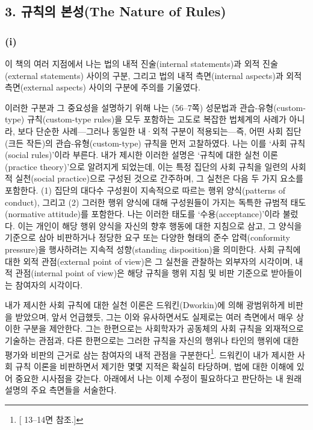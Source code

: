 \subsection{3. 규칙의 본성(The Nature of
Rules)}\label{uxaddcuxce59uxc758-uxbcf8uxc131the-nature-of-rules}

\subsubsection{\texorpdfstring{(i) }{(i) 규칙에 대한 실천 이론(The Practice Theory of Rules)}}\label{i-uxaddcuxce59uxc5d0-uxb300uxd55c-uxc2e4uxcc9c-uxc774uxb860the-practice-theory-of-rules}

이 책의 여러 지점에서 나는 법의 내적 진술(internal statements)과 외적
진술(external statements) 사이의 구분, 그리고 법의 내적 측면(internal
aspects)과 외적 측면(external aspects) 사이의 구분에 주의를 기울였다.

이러한 구분과 그 중요성을 설명하기 위해 나는 (56--7쪽) 성문법과
관습-유형(custom-type) 규칙(custom-type rules)을 모두 포함하는 고도로
복잡한 법체계의 사례가 아니라, 보다 단순한 사례---그러나 동일한 내·외적
구분이 적용되는---즉, 어떤 사회 집단(크든 작든)의 관습-유형(custom-type)
규칙을 먼저 고찰하였다. 나는 이를 `사회 규칙(social rules)'이라 부른다.
내가 제시한 이러한 설명은 `규칙에 대한 실천 이론(practice theory)'으로
알려지게 되었는데, 이는 특정 집단의 사회 규칙을 일련의 사회적
실천(social practice)으로 구성된 것으로 간주하며, 그 실천은 다음 두 가지
요소를 포함한다. (1) 집단의 대다수 구성원이 지속적으로 따르는 행위
양식(patterns of conduct), 그리고 (2) 그러한 행위 양식에 대해 구성원들이
가지는 독특한 규범적 태도(normative attitude)를 포함한다. 나는 이러한
태도를 `수용(acceptance)'이라 불렀다. 이는 개인이 해당 행위 양식을
자신의 향후 행동에 대한 지침으로 삼고, 그 양식을 기준으로 삼아
비판하거나 정당한 요구 또는 다양한 형태의 준수 압력(conformity
pressure)을 행사하려는 지속적 성향(standing disposition)을 의미한다.
사회 규칙에 대한 외적 관점(external point of view)은 그 실천을 관찰하는
외부자의 시각이며, 내적 관점(internal point of view)은 해당 규칙을 행위
지침 및 비판 기준으로 받아들이는 참여자의 시각이다.

내가 제시한 사회 규칙에 대한 실천 이론은 드워킨(Dworkin)에 의해
광범위하게 비판을 받았으며, 앞서 언급했듯, 그는 이와 유사하면서도
실제로는 여러 측면에서 매우 상이한 구분을 제안한다. 그는 한편으로는
사회학자가 공동체의 사회 규칙을 외재적으로 기술하는 관점과, 다른
한편으로는 그러한 규칙을 자신의 행위나 타인의 행위에 대한 평가와 비판의
근거로 삼는 참여자의 내적 관점을 구분한다\footnote{{[} 13--14면
  참조.{]}}. 드워킨이 내가 제시한 사회 규칙 이론을 비판하면서 제기한
몇몇 지적은 확실히 타당하며, 법에 대한 이해에 있어 중요한 시사점을
갖는다. 아래에서 나는 이제 수정이 필요하다고 판단하는 내 원래 설명의
주요 측면들을 서술한다.

